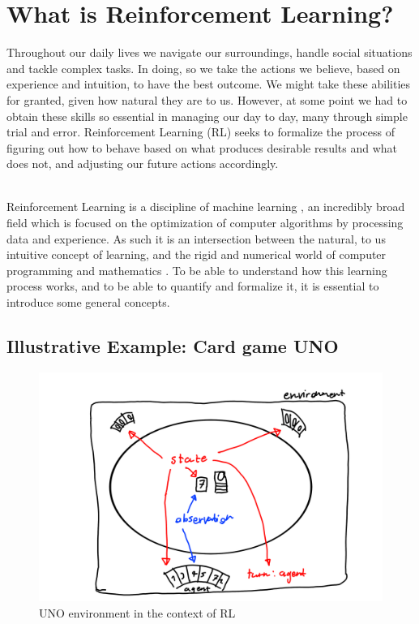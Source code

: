 \section{What is Reinforcement Learning?}\label{sec:what_is_rl}
\noindent
Throughout our daily lives we navigate our surroundings, handle social situations and tackle complex tasks. In doing, so we take the actions we believe, based on experience and intuition, to have the best outcome. We might take these abilities for granted, given how natural they are to us. However, at some point we had to obtain these skills so essential in managing our day to day, many through simple trial and error. Reinforcement Learning (RL) seeks to formalize the process of figuring out how to behave based on what produces desirable results and what does not, and adjusting our future actions accordingly. 

\noindent
\\ Reinforcement Learning is a discipline of machine learning \cite[p. 1]{sutton_reinforcement_2018}, an incredibly broad field which is focused on the optimization of computer algorithms by processing data and experience. As such it is an intersection between the natural, to us intuitive concept of learning, and the rigid and numerical world of computer programming and mathematics \cite[p. 4]{sutton_reinforcement_2018}. To be able to understand how this learning process works, and to be able to quantify and formalize it, it is essential to introduce some general concepts. 

\subsection{Illustrative Example: Card game UNO}\label{subsec:UNO}

\begin{figure}[ht]
    \centering
    \includegraphics[width=\linewidth]{figures/UNO.png}
    \caption{UNO environment in the context of RL}
    \label{fig:UNO}
\end{figure}


